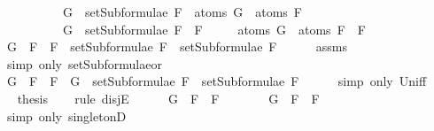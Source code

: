\begin{isabellebody}
\ \ \ \ \ \ \ \ \ \ {\isachardoublequoteopen}G\ {\isasymin}\ setSubformulae\ F{}\ {\isasymLongrightarrow}\ atoms\ G\ {\isasymsubseteq}\ atoms\ F{}{\isachardoublequoteclose}\isanewline
\ \ \ \ \ \ \ \ \ \ {\isachardoublequoteopen}G\ {\isasymin}\ setSubformulae\ {\isacharparenleft}F{}\ \isactrlbold {\isasymor}\ F{}{\isacharparenright}{\isachardoublequoteclose}\isanewline
\ \ \ \ \ {\isachardoublequoteopen}atoms\ G\ {\isasymsubseteq}\ atoms\ {\isacharparenleft}F{}\ \isactrlbold {\isasymor}\ F{}{\isacharparenright}{\isachardoublequoteclose}\isanewline
%
\isadelimproof
%
\endisadelimproof
%
\isatagproof
{}\isamarkupfalse%
\ {\isacharminus}\isanewline
\ \ \isamarkupfalse%
\ {\isachardoublequoteopen}G\ {\isasymin}\ {\isacharbraceleft}F{}\ \isactrlbold {\isasymor}\ F{}{\isacharbraceright}\ {\isasymunion}\ {\isacharparenleft}setSubformulae\ F{}\ {\isasymunion}\ setSubformulae\ F{}{\isacharparenright}{\isachardoublequoteclose}\isanewline
\ \ \ \ \isamarkupfalse%
\ assms{\isacharparenleft}{}{\isacharparenright}\ \isanewline
\ \ \ \ \isamarkupfalse%
\ {\isacharparenleft}simp\ only{\isacharcolon}\ setSubformulae{\isacharunderscore}or{\isacharparenright}\isanewline
\ \ \isamarkupfalse%
\ \isamarkupfalse%
\ {\isachardoublequoteopen}G\ {\isasymin}\ {\isacharbraceleft}F{}\ \isactrlbold {\isasymor}\ F{}{\isacharbraceright}\ {\isasymor}\ G\ {\isasymin}\ setSubformulae\ F{}\ {\isasymunion}\ setSubformulae\ F{}{\isachardoublequoteclose}\isanewline
\ \ \ \ \isamarkupfalse%
\ {\isacharparenleft}simp\ only{\isacharcolon}\ Un{\isacharunderscore}iff{\isacharparenright}\isanewline
\ \ \isamarkupfalse%
\ \isamarkupfalse%
\ {\isacharquery}thesis\isanewline
\ \ \isamarkupfalse%
\ {\isacharparenleft}rule\ disjE{\isacharparenright}\isanewline
\ \ \ \ \isamarkupfalse%
\ {\isachardoublequoteopen}G\ {\isasymin}\ {\isacharbraceleft}F{}\ \isactrlbold {\isasymor}\ F{}{\isacharbraceright}{\isachardoublequoteclose}\isanewline
\ \ \ \ \isamarkupfalse%
\ \isamarkupfalse%
\ {\isachardoublequoteopen}G\ {\isacharequal}\ F{}\ \isactrlbold {\isasymor}\ F{}{\isachardoublequoteclose}\isanewline
\ \ \ \ \ \ \isamarkupfalse%
\ {\isacharparenleft}simp\ only{\isacharcolon}\ singletonD{\isacharparenright}\isanewline

\end{isabellebody}
